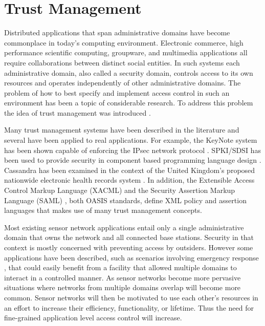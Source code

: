 
\chapter{Trust Management}
\label{chapter-trust-management}

Distributed applications that span administrative domains have become commonplace in today's
computing environment. Electronic commerce, high performance scientific computing, groupware,
and multimedia applications all require collaborations between distinct social entities. In such
systems each administrative domain, also called a security domain, controls access to its own
resources and operates independently of other administrative domains. The problem of how to best
specify and implement access control in such an environment has been a topic of considerable
research. To address this problem the idea of trust management was introduced \cite{Blaze:DTM}.

Many trust management systems have been described in the literature
\cite{chapin-skalka-wang-acmcs08} and several have been applied to real applications. For
example, the KeyNote system has been shown capable of enforcing the IPsec network protocol
\cite{Blaze:TMIPS,Blaze:EKTMS}. SPKI/SDSI has been used to provide security in component based
programming language design \cite{Liu:CSI}. Cassandra has been examined in the context of the
United Kingdom's proposed nationwide electronic health records system \cite{Becker:CFTMAEHR}. In
addition, the Extensible Access Control Markup Language (XACML) \cite{OASIS:XACMLTC} and the
Security Assertion Markup Language (SAML) \cite{OASIS:SSTC}, both OASIS standards, define XML
policy and assertion languages that makes use of many trust management concepts.

Most existing sensor network applications entail only a single administrative domain that owns
the network and all connected base stations. Security in that context is mostly concerned with
preventing access by outsiders. However some applications have been described, such as scenarios
involving emergency response \cite{1038146}, that could easily benefit from a facility that
allowed multiple domains to interact in a controlled manner. As sensor networks become more
pervasive situations where networks from multiple domains overlap will become more common.
Sensor networks will then be motivated to use each other's resources in an effort to increase
their efficiency, functionality, or lifetime. Thus the need for fine-grained application level
access control will increase.

